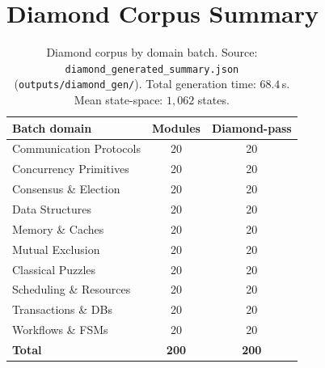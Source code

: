 \documentclass[10pt,twocolumn]{article}
\begin{document}
\section{Diamond Corpus Summary}
\label{app:corpus}

\begin{table}[h]
\centering
\scriptsize
\begin{tabular}{@{}lcc@{}}
\toprule
Batch domain & Modules & Diamond-pass \\
\midrule
Communication Protocols & 20 & 20 \\
Concurrency Primitives  & 20 & 20 \\
Consensus \& Election   & 20 & 20 \\
Data Structures         & 20 & 20 \\
Memory \& Caches        & 20 & 20 \\
Mutual Exclusion        & 20 & 20 \\
Classical Puzzles       & 20 & 20 \\
Scheduling \& Resources & 20 & 20 \\
Transactions \& DBs     & 20 & 20 \\
Workflows \& FSMs       & 20 & 20 \\
\midrule
\textbf{Total}          & \textbf{200} & \textbf{200} \\
\bottomrule
\end{tabular}
\caption{Diamond corpus by domain batch.
Source: \texttt{diamond\_generated\_summary.json}
(\texttt{outputs/diamond\_gen/}).
Total generation time: $68.4$\,s. Mean state-space: $1{,}062$ states.}
\label{tab:corpus}
\end{table}
\end{document}

